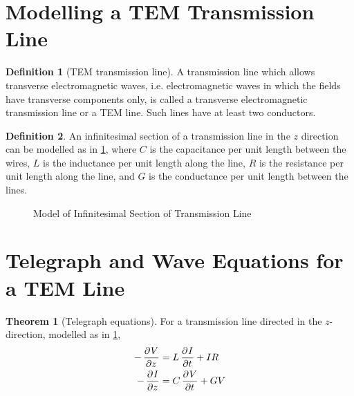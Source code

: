 \documentclass[titlepage, fleqn, a4paper, 12pt, twoside]{article}
\theoremstyle{definition}
\newtheorem{definition}{Definition}
\theoremstyle{theorem}
\newtheorem{theorem}{Theorem}
\begin{document}
\section{Modelling a TEM Transmission Line}

\begin{definition}[TEM transmission line]
	A transmission line which allows transverse electromagnetic waves, i.e. electromagnetic waves in which the fields have transverse components only, is called a transverse electromagnetic transmission line or a TEM line.
	Such lines have at least two conductors.
\end{definition}

\begin{definition}
	An infinitesimal section of a transmission line in the $z$ direction can be modelled as in \cref{fig:model_of_infinitesimal_section_of_transmission_line},
	where $C$ is the capacitance per unit length between the wires, $L$ is the inductance per unit length along the line, $R$ is the resistance per unit length along the line, and $G$ is the conductance per unit length between the lines.
	\begin{figure}[H]
		\centering
		\caption{Model of Infinitesimal Section of Transmission Line}
		\label{fig:model_of_infinitesimal_section_of_transmission_line}
	\end{figure}
\end{definition}

\section{Telegraph and Wave Equations for a TEM Line}

\begin{theorem}[Telegraph equations]
	For a transmission line directed in the $z$-direction, modelled as in \cref{fig:model_of_infinitesimal_section_of_transmission_line},
	\begin{align*}
		-\dpd{V}{z} &= L \dpd{I}{t} + I R\\
		-\dpd{I}{z} &= C \dpd{V}{t} + G V
	\end{align*}
	\label{thm:telegraph_equations}
\end{theorem}
\end{document}

